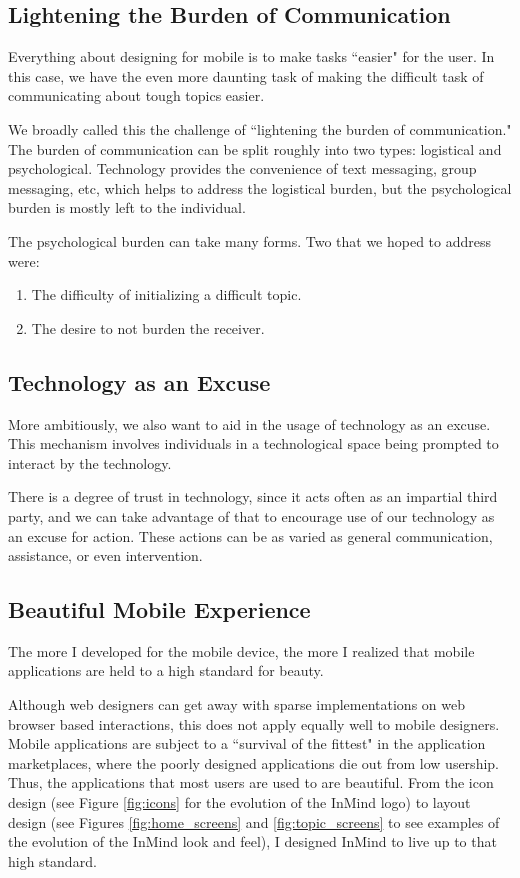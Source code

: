     \subsection{Lightening the Burden of Communication}
    Everything about designing for mobile is to make tasks ``easier" for the user.
    In this case, we have the even more daunting task of making
    the difficult task of communicating about tough topics easier.

    We broadly called this the challenge of ``lightening the burden of communication."
    The burden of communication can be split roughly into two types:
    logistical and psychological.
    Technology provides the convenience of text messaging,
    group messaging, etc, which helps to address the logistical burden,
    but the psychological burden is mostly left to the individual.

    The psychological burden can take many forms.
    Two that we hoped to address were:
    \begin{enumerate}
    \item The difficulty of initializing a difficult topic.
    \item The desire to not burden the receiver.
    \end{enumerate}

    \subsection{Technology as an Excuse}
    More ambitiously, we also want to aid in the usage of technology as an excuse.
    This mechanism involves individuals in a technological space being prompted
    to interact by the technology.
    
    There is a degree of trust in technology, since it acts often as an impartial third party,
    and we can take advantage of that to encourage use of our technology as an excuse for action.
    These actions can be as varied as 
    general communication,
    assistance, or even intervention.

    \subsection{Beautiful Mobile Experience}
    The more I developed for the mobile device,
    the more I realized that mobile applications are held to a high standard for beauty.

    Although web designers can get away with sparse implementations on web browser based
    interactions,
    this does not apply equally well to mobile designers.
    Mobile applications are subject to a ``survival of the fittest" in the application
    marketplaces, where the poorly designed applications die out from low usership.
    Thus, the applications that most users are used to are beautiful.
    From the icon design (see Figure \ref{fig:icons} for the evolution of the InMind logo)
    to layout design (see Figures \ref{fig:home_screens} and \ref{fig:topic_screens}
    to see examples of the evolution of the InMind look and feel),
    I designed InMind to live up to that high standard.

